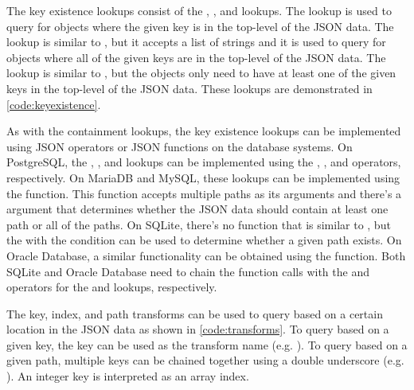 \noindent
\begin{minipage}{\linewidth}

\end{minipage}

The key existence lookups consist of the , , and
 lookups. The  lookup is used to query for
objects where the given key is in the top-level of the JSON data. The
 lookup is similar to , but it accepts a list of
strings and it is used to query for objects where all of the given keys are
in the top-level of the JSON data. The  lookup is similar
to , but the objects only need to have at least one of the
given keys in the top-level of the JSON data. These lookups are demonstrated in
\autoref{code:keyexistence}.

As with the containment lookups, the key existence lookups can be implemented
using JSON operators or JSON functions on the database systems. On PostgreSQL,
the , , and  lookups can be
implemented using the , , and  operators,
respectively. On MariaDB and MySQL, these lookups can be implemented using the
 function. This function accepts multiple paths as
its arguments and there's a  argument that determines
whether the JSON data should contain at least one path or all of the paths. On
SQLite, there's no function that is similar to , but
the  with the  condition can be used to
determine whether a given path exists. On Oracle Database, a similar
functionality can be obtained using the  function. Both
SQLite and Oracle Database need to chain the function calls with the 
and  operators for the  and 
lookups, respectively.

\noindent
\begin{minipage}{\linewidth}

\end{minipage}

The key, index, and path transforms can be used to query based on a certain
location in the JSON data as shown in \autoref{code:transforms}. To query based
on a given key, the key can be used as the transform name (e.g.
). To query based on a given path, multiple keys can be
chained together using a double underscore (e.g. ).
An integer key is interpreted as an array index.

